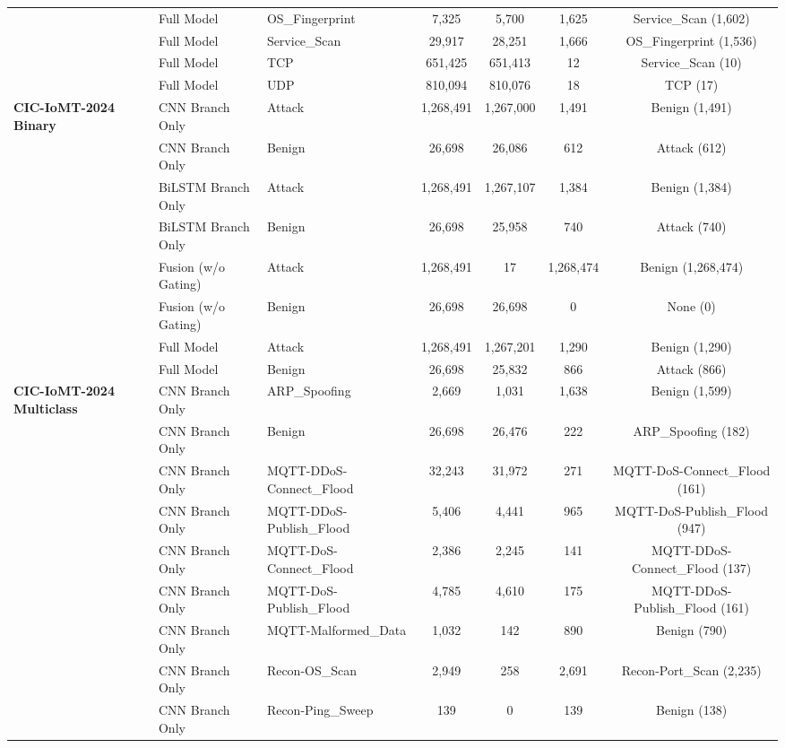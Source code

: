 \documentclass[a4paper,fleqn]{cas-sc}
\begin{document}
\begin{landscape}
\begin{longtable}{lllcccc}
 & Full Model & OS\_Fingerprint & 7,325 & 5,700 & 1,625 & Service\_Scan (1,602) \\
 & Full Model & Service\_Scan & 29,917 & 28,251 & 1,666 & OS\_Fingerprint (1,536) \\
 & Full Model & TCP & 651,425 & 651,413 & 12 & Service\_Scan (10) \\
 & Full Model & UDP & 810,094 & 810,076 & 18 & TCP (17) \\
\midrule
\multirow{8}{*}{\textbf{CIC-IoMT-2024 Binary}} & CNN Branch Only & Attack & 1,268,491 & 1,267,000 & 1,491 & Benign (1,491) \\
 & CNN Branch Only & Benign & 26,698 & 26,086 & 612 & Attack (612) \\
 & BiLSTM Branch Only & Attack & 1,268,491 & 1,267,107 & 1,384 & Benign (1,384) \\
 & BiLSTM Branch Only & Benign & 26,698 & 25,958 & 740 & Attack (740) \\
 & Fusion (w/o Gating) & Attack & 1,268,491 & 17 & 1,268,474 & Benign (1,268,474) \\
 & Fusion (w/o Gating) & Benign & 26,698 & 26,698 & 0 & None (0) \\
 & Full Model & Attack & 1,268,491 & 1,267,201 & 1,290 & Benign (1,290) \\
 & Full Model & Benign & 26,698 & 25,832 & 866 & Attack (866) \\
\midrule
\multirow{76}{*}{\textbf{CIC-IoMT-2024 Multiclass}} & CNN Branch Only & ARP\_Spoofing & 2,669 & 1,031 & 1,638 & Benign (1,599) \\
 & CNN Branch Only & Benign & 26,698 & 26,476 & 222 & ARP\_Spoofing (182) \\
 & CNN Branch Only & MQTT-DDoS-Connect\_Flood & 32,243 & 31,972 & 271 & MQTT-DoS-Connect\_Flood (161) \\
 & CNN Branch Only & MQTT-DDoS-Publish\_Flood & 5,406 & 4,441 & 965 & MQTT-DoS-Publish\_Flood (947) \\
 & CNN Branch Only & MQTT-DoS-Connect\_Flood & 2,386 & 2,245 & 141 & MQTT-DDoS-Connect\_Flood (137) \\
 & CNN Branch Only & MQTT-DoS-Publish\_Flood & 4,785 & 4,610 & 175 & MQTT-DDoS-Publish\_Flood (161) \\
 & CNN Branch Only & MQTT-Malformed\_Data & 1,032 & 142 & 890 & Benign (790) \\
 & CNN Branch Only & Recon-OS\_Scan & 2,949 & 258 & 2,691 & Recon-Port\_Scan (2,235) \\
 & CNN Branch Only & Recon-Ping\_Sweep & 139 & 0 & 139 & Benign (138) \\

\end{longtable}
\end{landscape}
\end{document}
